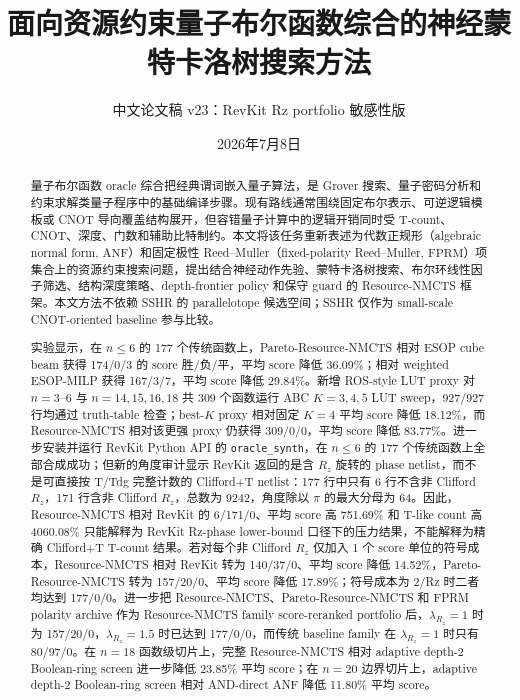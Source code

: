\documentclass[UTF8,fontset=macnew,11pt]{ctexart}
\title{面向资源约束量子布尔函数综合的神经蒙特卡洛树搜索方法}
\author{中文论文稿 v23：RevKit Rz portfolio 敏感性版}
\date{2026年7月8日}
\newcommand{\method}{Resource-NMCTS}
\newcommand{\screen}{Boolean-ring screen}
\newcommand{\anf}{\ensuremath{\mathrm{ANF}}}
\newcommand{\fprm}{\ensuremath{\mathrm{FPRM}}}
\begin{document}
\pagestyle{plain}
\maketitle

\begin{abstract}
量子布尔函数 oracle 综合把经典谓词嵌入量子算法，是 Grover 搜索、量子密码分析和约束求解类量子程序中的基础编译步骤。现有路线通常围绕固定布尔表示、可逆逻辑模板或 CNOT 导向覆盖结构展开，但容错量子计算中的逻辑开销同时受 T-count、CNOT、深度、门数和辅助比特制约。本文将该任务重新表述为代数正规形（algebraic normal form, \anf{}）和固定极性 Reed--Muller（fixed-polarity Reed--Muller, \fprm{}）项集合上的资源约束搜索问题，提出结合神经动作先验、蒙特卡洛树搜索、布尔环线性因子筛选、结构深度策略、depth-frontier policy 和保守 guard 的 \method{} 框架。本文方法不依赖 SSHR 的 parallelotope 候选空间；SSHR 仅作为 small-scale CNOT-oriented baseline 参与比较。

实验显示，在 $n\leq6$ 的 177 个传统函数上，Pareto-\method{} 相对 ESOP cube beam 获得 174/0/3 的 score 胜/负/平，平均 score 降低 36.09\%；相对 weighted ESOP-MILP 获得 167/3/7，平均 score 降低 29.84\%。新增 ROS-style LUT proxy 对 $n=3$--$6$ 与 $n=14,15,16,18$ 共 309 个函数运行 ABC $K=3,4,5$ LUT sweep，927/927 行均通过 truth-table 检查；best-$K$ proxy 相对固定 $K=4$ 平均 score 降低 18.12\%，而 \method{} 相对该更强 proxy 仍获得 309/0/0，平均 score 降低 83.77\%。进一步安装并运行 RevKit Python API 的 \texttt{oracle\_synth}，在 $n\leq6$ 的 177 个传统函数上全部合成成功；但新的角度审计显示 RevKit 返回的是含 $R_z$ 旋转的 phase netlist，而不是可直接按 T/Tdg 完整计数的 Clifford+T netlist：177 行中只有 6 行不含非 Clifford $R_z$，171 行含非 Clifford $R_z$，总数为 9242，角度除以 $\pi$ 的最大分母为 64。因此，\method{} 相对 RevKit 的 6/171/0、平均 score 高 751.69\% 和 T-like count 高 4060.08\% 只能解释为 RevKit Rz-phase lower-bound 口径下的压力结果，不能解释为精确 Clifford+T T-count 结果。若对每个非 Clifford $R_z$ 仅加入 1 个 score 单位的符号成本，\method{} 相对 RevKit 转为 140/37/0、平均 score 降低 14.52\%，Pareto-\method{} 转为 157/20/0、平均 score 降低 17.89\%；符号成本为 2/Rz 时二者均达到 177/0/0。进一步把 \method{}、Pareto-\method{} 和 FPRM polarity archive 作为 Resource-NMCTS family score-reranked portfolio 后，$\lambda_{R_z}=1$ 时为 157/20/0，$\lambda_{R_z}=1.5$ 时已达到 177/0/0，而传统 baseline family 在 $\lambda_{R_z}=1$ 时只有 80/97/0。在 $n=18$ 函数级切片上，完整 \method{} 相对 adaptive depth-2 \screen{} 进一步降低 23.85\% 平均 score；在 $n=20$ 边界切片上，adaptive depth-2 \screen{} 相对 AND-direct ANF 降低 11.80\% 平均 score。


\end{abstract}
\end{document}
